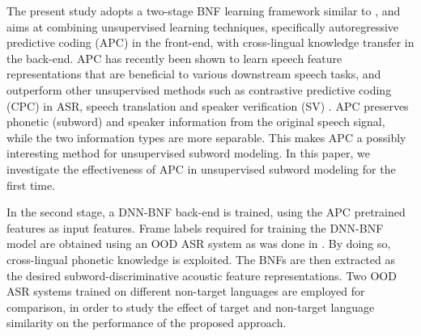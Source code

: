 \documentclass[a4paper]{article}
\begin{document}
The present study  adopts a two-stage BNF learning framework similar to  \cite{Feng2019improving}, and aims at
combining unsupervised   learning techniques, specifically autoregressive predictive coding (APC) in the front-end, with  cross-lingual   knowledge transfer in the back-end. 
APC   has recently been shown   \cite{Chung2019} to learn speech feature representations that are beneficial to 
various downstream speech tasks, and outperform other
unsupervised methods such as contrastive predictive coding (CPC) \cite{oord2018cpc} 
in ASR, speech translation and speaker verification (SV)  \cite{Chung2019generative}.
 APC preserves   phonetic (subword) and speaker information from the original speech signal, while the two information types are more  separable. This makes APC a possibly interesting  method for unsupervised subword modeling. %
In this paper, we investigate the effectiveness of APC in unsupervised subword modeling for the first time.

In  the second stage, a DNN-BNF back-end is trained, using the APC pretrained features as input features. 
Frame labels required for training the DNN-BNF model are obtained using an OOD  ASR system as was done in \cite{feng2019_TASLP}.  
{\color{blue} By doing so, cross-lingual phonetic knowledge is exploited.}
The BNFs are then extracted as the desired subword-discriminative acoustic feature representations. 
{\color{blue} Two OOD ASR systems trained on  different non-target languages are employed for comparison, in order to study the effect of target and non-target language similarity on the performance of the proposed approach.}
\end{document}
